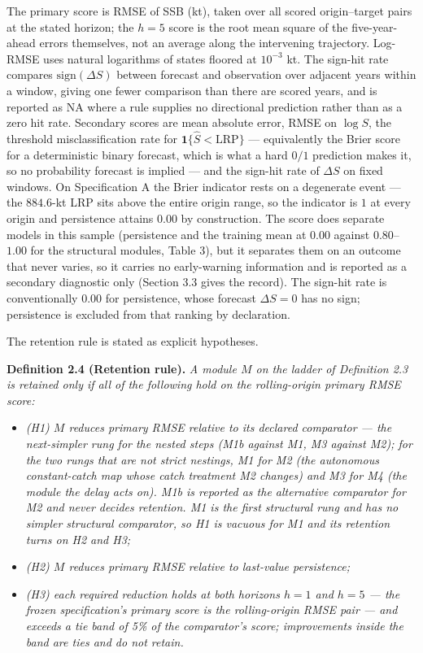 \documentclass[11pt]{article}
\providecommand{\tightlist}{\setlength{\itemsep}{0pt}\setlength{\parskip}{0pt}}
\begin{document}
The primary score is RMSE of SSB (kt), taken over all scored
origin--target pairs at the stated horizon; the \(h=5\) score is the
root mean square of the five-year-ahead errors themselves, not an
average along the intervening trajectory. Log-RMSE uses natural
logarithms of states floored at \(10^{-3}\) kt. The sign-hit rate
compares \(\mathrm{sign}(\Delta S)\) between forecast and observation
over adjacent years within a window, giving one fewer comparison than
there are scored years, and is reported as NA where a rule supplies no
directional prediction rather than as a zero hit rate. Secondary scores are mean
absolute error, RMSE on \(\log S\), the threshold misclassification
rate for \(\mathbf{1}\{\hat S<\mathrm{LRP}\}\) --- equivalently the
Brier score for a deterministic binary forecast, which is what a hard
\(0/1\) prediction makes it, so no probability forecast is implied ---
and the sign-hit rate of \(\Delta S\) on fixed windows. On Specification A the Brier indicator
rests on a degenerate event --- the \(884.6\)-kt LRP sits above the
entire origin range, so the indicator is \(1\) at every origin and
persistence attains \(0.00\) by construction. The score does separate
models in this sample (persistence and the training mean at \(0.00\)
against \(0.80\)--\(1.00\) for the structural modules, Table 3), but it
separates them on an outcome that never varies, so it carries no
early-warning information and is reported as a secondary diagnostic only
(Section 3.3 gives the record). The
sign-hit rate is conventionally \(0.00\) for persistence, whose forecast
\(\Delta S = 0\) has no sign; persistence is excluded from that ranking
by declaration.

The retention rule is stated as explicit hypotheses.

\textbf{Definition 2.4 (Retention rule).} \emph{A module \(M\) on the
ladder of Definition 2.3 is retained only if all of the following hold
on the rolling-origin primary RMSE score:}

\begin{itemize}
\tightlist
\item
  \emph{(H1) \(M\) reduces primary RMSE relative to its declared
  comparator --- the next-simpler rung for the nested steps (M1b against
  M1, M3 against M2); for the two rungs that are not strict nestings, M1
  for M2 (the autonomous constant-catch map whose catch treatment M2
  changes) and M3 for M4 (the module the delay acts on). M1b is reported
  as the alternative comparator for M2 and never decides retention. M1
  is the first structural rung and has no simpler structural comparator,
  so H1 is vacuous for M1 and its retention turns on H2 and H3;}
\item
  \emph{(H2) \(M\) reduces primary RMSE relative to last-value
  persistence;}
\item
  \emph{(H3) each required reduction holds at both horizons \(h=1\) and
  \(h=5\) --- the frozen specification's primary score is the
  rolling-origin RMSE pair --- and exceeds a tie band of 5\% of the
  comparator's score; improvements inside the band are ties and do not
  retain.}
\end{itemize}
\end{document}
